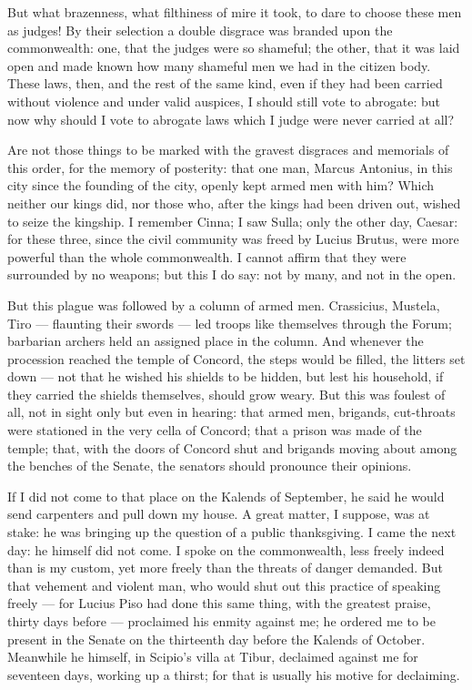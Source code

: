  But what brazenness, what filthiness of mire it took, to dare to choose these men as judges! By their selection a double disgrace was branded upon the commonwealth: one, that the judges were so shameful; the other, that it was laid open and made known how many shameful men we had in the citizen body. These laws, then, and the rest of the same kind, even if they had been carried without violence and under valid auspices, I should still vote to abrogate: but now why should I vote to abrogate laws which I judge were never carried at all?

 Are not those things to be marked with the gravest disgraces and memorials of this order, for the memory of posterity: that one man, Marcus Antonius, in this city since the founding of the city, openly kept armed men with him? Which neither our kings did, nor those who, after the kings had been driven out, wished to seize the kingship. I remember Cinna; I saw Sulla; only the other day, Caesar: for these three, since the civil community was freed by Lucius Brutus, were more powerful than the whole commonwealth. I cannot affirm that they were surrounded by no weapons; but this I do say: not by many, and not in the open.

 But this plague was followed by a column of armed men. Crassicius, Mustela, Tiro --- flaunting their swords --- led troops like themselves through the Forum; barbarian archers held an assigned place in the column. And whenever the procession reached the temple of Concord, the steps would be filled, the litters set down --- not that he wished his shields to be hidden, but lest his household, if they carried the shields themselves, should grow weary. But this was foulest of all, not in sight only but even in hearing: that armed men, brigands, cut-throats were stationed in the very cella of Concord; that a prison was made of the temple; that, with the doors of Concord shut and brigands moving about among the benches of the Senate, the senators should pronounce their opinions.

 If I did not come to that place on the Kalends of September, he said he would send carpenters and pull down my house. A great matter, I suppose, was at stake: he was bringing up the question of a public thanksgiving. I came the next day: he himself did not come. I spoke on the commonwealth, less freely indeed than is my custom, yet more freely than the threats of danger demanded. But that vehement and violent man, who would shut out this practice of speaking freely --- for Lucius Piso had done this same thing, with the greatest praise, thirty days before --- proclaimed his enmity against me; he ordered me to be present in the Senate on the thirteenth day before the Kalends of October. Meanwhile he himself, in Scipio's villa at Tibur, declaimed against me for seventeen days, working up a thirst; for that is usually his motive for declaiming.

